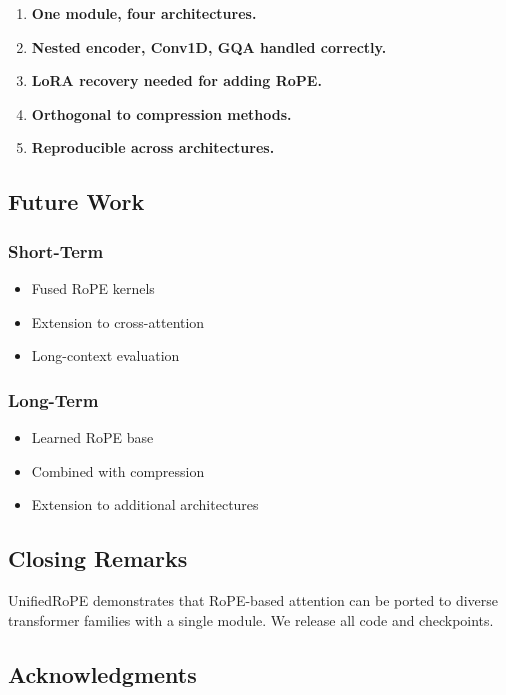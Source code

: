 {\begin{enumerate}
\item \textbf{One module, four architectures.}
\item \textbf{Nested encoder, Conv1D, GQA handled correctly.}
\item \textbf{LoRA recovery needed for adding RoPE.}
\item \textbf{Orthogonal to compression methods.}
\item \textbf{Reproducible across architectures.}

\end{enumerate}
\subsection{Future Work}

\subsubsection{Short-Term}
\begin{itemize}
\item Fused RoPE kernels
\item Extension to cross-attention
\item Long-context evaluation

\end{itemize}
\subsubsection{Long-Term}
\begin{itemize}
\item Learned RoPE base
\item Combined with compression
\item Extension to additional architectures

\end{itemize}
\subsection{Closing Remarks}

UnifiedRoPE demonstrates that RoPE-based attention can be ported to diverse 
transformer families with a single module. We release all code and 
checkpoints.

\subsection{Acknowledgments}

}
